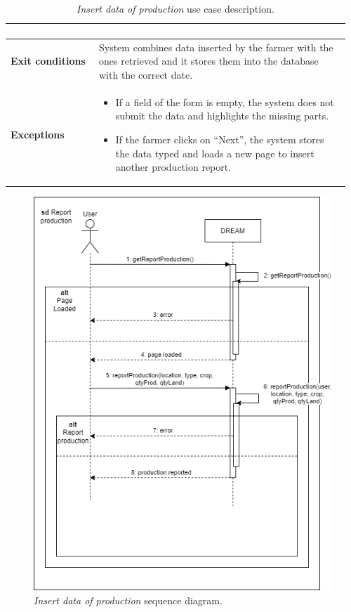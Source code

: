 \begin{table}[H]
\begin{tabular}{@{}p{0.25\linewidth}p{0.71\linewidth}@{}}
\begin{enumerate}[label=\roman*.,leftmargin=.5cm,noitemsep,topsep=0pt,before=\vspace{-3mm},after=\vspace{-4mm}]
        \end{enumerate} \\
        \hline
        \textbf{Exit conditions} & System combines data inserted by the farmer with the ones retrieved and it stores them into the database with the correct date.\\
        \hline
        \textbf{Exceptions} &
        \begin{itemize}[leftmargin=.4cm,noitemsep,topsep=0pt,before=\vspace{-3mm},after=\vspace{-4mm}]
            \item If a field of the form is empty, the system does not submit the data and highlights the missing parts.
            \item If the farmer clicks on “Next”, the system stores the data typed and loads a new page to insert another production report.
        \end{itemize} \\
        \hline
    \end{tabular}
    \caption{\textit{Insert data of production} use case description.}
\end{table}
\begin{figure}[H]
    \centering
    \includegraphics[width=\linewidth]{Images/Use Case/UC11.png}
    \caption{\textit{Insert data of production} sequence diagram.}
\end{figure}
\newpage

